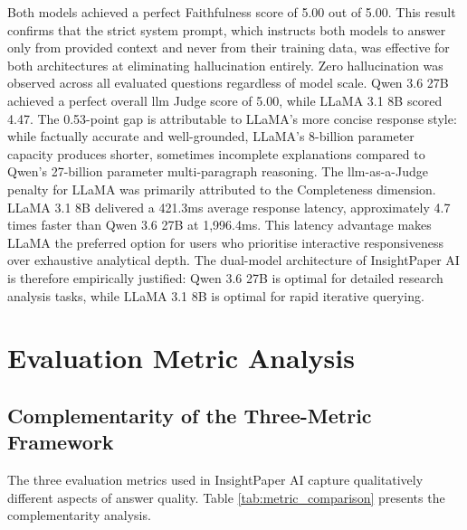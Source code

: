 Both models achieved a perfect Faithfulness score of 5.00 out of 5.00. This result confirms that the strict system prompt, which instructs both models to answer only from provided context and never from their training data, was effective for both architectures at eliminating hallucination entirely. Zero hallucination was observed across all evaluated questions regardless of model scale.
\newline \newline Qwen 3.6 27B achieved a perfect overall \gls{llm} Judge score of 5.00, while LLaMA 3.1 8B scored 4.47. The 0.53-point gap is attributable to LLaMA's more concise response style: while factually accurate and well-grounded, LLaMA's 8-billion parameter capacity produces shorter, sometimes incomplete explanations compared to Qwen's 27-billion parameter multi-paragraph reasoning. The \gls{llm}-as-a-Judge penalty for LLaMA was primarily attributed to the Completeness dimension.
\newline \newline LLaMA 3.1 8B delivered a 421.3ms average response latency, approximately 4.7 times faster than Qwen 3.6 27B at 1,996.4ms. This latency advantage makes LLaMA the preferred option for users who prioritise interactive responsiveness over exhaustive analytical depth.
\newline \newline The dual-model architecture of InsightPaper AI is therefore empirically justified: Qwen 3.6 27B is optimal for detailed research analysis tasks, while LLaMA 3.1 8B is optimal for rapid iterative querying.

\section{Evaluation Metric Analysis}

\subsection{Complementarity of the Three-Metric Framework}

The three evaluation metrics used in InsightPaper AI capture qualitatively different aspects of answer quality. Table \ref{tab:metric_comparison} presents the complementarity analysis.

